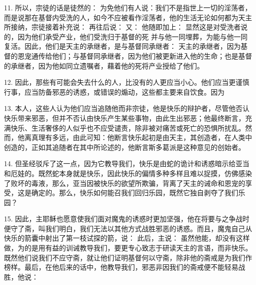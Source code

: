 11. 所以，宗徒的话是徒然的：  为免他们有人说：我们不是指世上一切的淫荡者，而是说那在基督内受洗的人，如今不应被看作淫荡者，他的生活无论如何都为天主所接纳，宗徒接着补充说： 再往后说：  又：  他随即加上：  显然这是对受洗者说的，因为他们承受产业，他们受洗归于基督的死  并与他一同埋葬，为能与他一同复活。因此，他们是天主的承继者，是与基督同承继者： 天主的承继者，因为基督的恩宠通传给他们；与基督同承继者，因为他们被更新进入他的生命；也是基督的承继者，因为他如同立遗嘱者，藉着他的死将产业授给了他们。\par

12. 因此，那些有可能会失去什么的人，比没有的人更应当小心。他们应当更谨慎行事，应当防备邪恶的诱惑，或错误的煽动，这些都主要来自饮食。因为  \par

13. 本人，这些人认为他们应当追随他而非宗徒，他是快乐的辩护者，尽管他否认快乐带来邪恶，但并不否认由快乐产生某些事物，由此生出邪恶；他最终断言，充满快乐、生活奢侈的人似乎也不应受谴责，除非被对痛苦或死亡的恐惧所扰乱。然而，他离真理有多远，由此可知：他断言快乐起初是由天主，其创造者，在人类中创造的，正如其追随者在其中所论述的，他断言斯多葛派是这种意见的创始者。\par

14. 但圣经驳斥了这一点，因为它教导我们，快乐是由蛇的诡计和诱惑暗示给亚当和厄娃的。既然蛇本身就是快乐，因此快乐的偏情多种多样且难以捉摸，仿佛感染了败坏的毒液，那么，亚当因被快乐的欲望所欺骗，背离了天主的诫命和恩宠的享受，这是确定的。那么，快乐如何能召我们回归乐园，既然它独自剥夺了我们乐园？\par

15. 因此，主耶稣也愿意使我们面对魔鬼的诱惑时更加坚强，他在将要与之争战时便守了斋，叫我们明白，我们无法以其他方式战胜邪恶的诱惑。而且，魔鬼自己从快乐的箭囊中射出了第一枝试探的箭，说：  此后，主说：  虽然他能，却没有这样做，为的是用有益的训诫教导我们，要更专心致志于研读天主的言语，而非快乐。既然他们说我们不应守斋，就让他们证明基督何以守斋，除非他的斋戒是为我们作榜样。最后，在他后来的话中，他教导我们，邪恶非因我们的斋戒便不能轻易战胜，他说： \par

